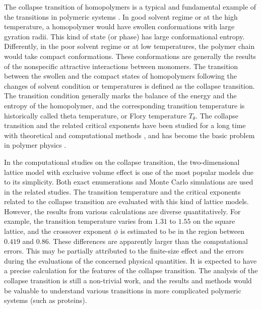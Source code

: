 \documentclass[preprint,preprintnumbers,amsmath,amssymb,showpacs,aps,pre]{revtex4-1}
\begin{document}
The collapse transition of homopolymers is a typical and fundamental
example of the transitions in polymeric systems \cite{LifshitzRMP78,
FloryBOOK67,deGennesBook79,ZivPCCP09,ChengBook08}. In good solvent
regime or at the high temperature, a homopolymer would have swollen
conformations with large gyration radii. This kind of state (or phase)
has large conformational entropy. Differently, in the poor solvent
regime or at low temperatures, the polymer chain would take compact
conformations. These conformations are generally the results of the
nonspecific attractive interactions between monomers. The transition
between the swollen and the compact states of homopolymers following
the changes of solvent condition or temperatures is defined as the
collapse transition. The transition condition generally marks the
balance of the energy and the entropy of the homopolymer, and the
corresponding transition temperature is historically called theta
temperature, or Flory temperature $T_{\theta}$\cite{FloryJCP49}.
The collapse transition and the related critical exponents have been
studied for a long time with theoretical and computational methods
\cite{deGennesBook79,PrivmanBook81,ZivPCCP09,SaleurJSP86,
DuplantierPRL87,StanleyPRB89,BinderBook95,OYJCP08,CaparicaCPC09,
BinderBook10}, and has become the basic problem in polymer physics
\cite{LifshitzRMP78,deGennesBook79,ZivPCCP09,ChengBook08}.

In the computational studies on the collapse transition, the
two-dimensional lattice model with exclusive volume effect is
one of the most popular models due to its simplicity. Both exact
enumerations and Monte Carlo simulations are used in the related
studies\cite{SaleurJSP86,DuplantierPRL87,StanleyPRB89,OYJCP08,
DerridaJPA85,SenoJP88,ChangPRE93,HeegerJP95,MurthyPRE01}. The
transition temperature and the critical exponents related to the
collapse transition are evaluated with this kind of lattice models.
However, the results from various calculations are diverse
quantitatively. For example, the transition temperature varies from
$1.31$ to $1.55$ on the square lattice, and the crossover exponent
$\phi$ is estimated to be in the region between $0.419$ and $0.86$.
These differences are apparently larger than the computational
errors. This may be partially attributed to the finite-size effect
and the errors during the evaluations of the concerned physical
quantities. It is expected to have a precise calculation for the
features of the collapse transition. The analysis of the collapse
transition is still a non-trivial work, and the results and methods
would be valuable to understand various transitions in more
complicated polymeric systems (such as proteins\cite{ZivPCCP09}).
\end{document}
